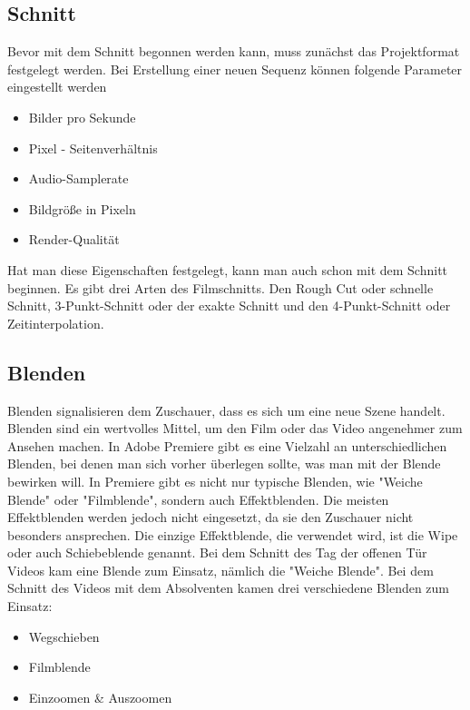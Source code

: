 \subsection{Schnitt}
Bevor mit dem Schnitt begonnen werden kann, muss zunächst das Projektformat festgelegt werden. Bei Erstellung einer neuen Sequenz können folgende Parameter eingestellt werden
\begin{itemize}
	\item Bilder pro Sekunde
	\item Pixel - Seitenverhältnis
	\item Audio-Samplerate
	\item Bildgröße in Pixeln
	\item Render-Qualität
\end{itemize}
Hat man diese Eigenschaften festgelegt, kann man auch schon mit dem Schnitt beginnen. Es gibt drei Arten des Filmschnitts. Den Rough Cut oder schnelle Schnitt, 3-Punkt-Schnitt oder der exakte Schnitt und den 4-Punkt-Schnitt oder Zeitinterpolation.
\subsection{Blenden}
Blenden signalisieren dem Zuschauer, dass es sich um eine neue Szene handelt. Blenden sind ein wertvolles Mittel, um den Film oder das Video angenehmer zum Ansehen machen. In Adobe Premiere gibt es eine Vielzahl an unterschiedlichen Blenden, bei denen man sich vorher überlegen sollte, was man mit der Blende bewirken will. In Premiere gibt es nicht nur typische Blenden, wie "Weiche Blende" oder "Filmblende", sondern auch Effektblenden. Die meisten Effektblenden werden jedoch nicht eingesetzt, da sie den Zuschauer nicht besonders ansprechen. Die einzige Effektblende, die verwendet wird, ist die Wipe oder auch Schiebeblende genannt.\newline
Bei dem Schnitt des Tag der offenen Tür Videos kam eine Blende zum Einsatz, nämlich die "Weiche Blende".\newline
Bei dem Schnitt des Videos mit dem Absolventen kamen drei verschiedene Blenden zum Einsatz:
\begin{itemize}
	\item Wegschieben
	\item Filmblende
	\item Einzoomen \& Auszoomen
\end{itemize}
